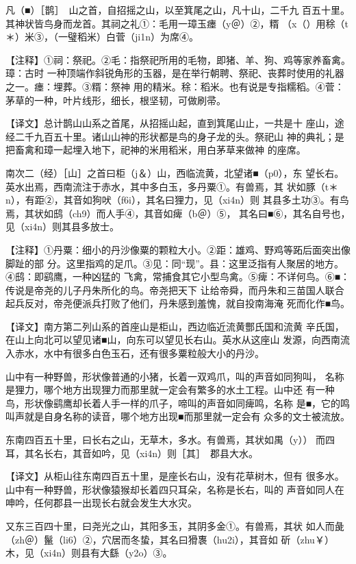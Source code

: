 \documentclass[a4paper,12pt,UTF8,twoside]{ctexbook}
\begin{document}
凡（■）［鹊］　山之首，自招摇之山，以至箕尾之山，凡十山，二千九 百五十里。其神状皆鸟身而龙首。其祠之礼①：毛用一璋玉瘗（y＠）②，糈 （x（）用稌（t＊）米③，（一璧稻米）白菅（ji1n）为席④。

【注释】①祠：祭祀。②毛：指祭祀所用的毛物，即猪、羊、狗、鸡等家养畜禽。璋：古时 一种顶端作斜锐角形的玉器，是在举行朝聘、祭祀、丧葬时使用的礼器之一。瘗：埋葬。③糈：祭神 用的精米。稌：稻米。也有说是专指糯稻。④菅：茅草的一种，叶片线形，细长，根坚韧，可做刷帚。

【译文】总计鹊山山系之首尾，从招摇山起，直到箕尾山止，一共是十 座山，途经二千九百五十里。诸山山神的形状都是鸟的身子龙的头。祭祀山 神的典礼；是把畜禽和璋一起埋入地下，祀神的米用稻米，用白茅草来做神 的座席。

南次二（经）［山］之首曰柜（j＆）山，西临流黄，北望诸■（p0），东 望长右。英水出焉，西南流注于赤水，其中多白玉，多丹粟①。有兽焉，其 状如豚（t＊n），有距②，其音如狗吠（f6i），其名曰狸力，见（xi4n）则 其县多土功③。有鸟焉，其状如鸱（ch9）而人手④，其音如痺（b＠）⑤， 其名曰■⑥，其名自号也，见（xi4n）则其县多放士。

【注释】①丹粟：细小的丹沙像粟的颗粒大小。②距：雄鸡、野鸡等跖后面突出像脚趾的部 分。这里指鸡的足爪。③见：同“现”。县：这里泛指有人聚居的地方。④鸱：即鹞鹰，一种凶猛的 飞禽，常捕食其它小型鸟禽。⑤痺：不详何鸟。⑥■：传说是帝尧的儿子丹朱所化的鸟。帝尧把天下 让给帝舜，而丹朱和三苗国人联合起兵反对，帝尧便派兵打败了他们，丹朱感到羞愧，就自投南海淹 死而化作■鸟。

【译文】南方第二列山系的首座山是柜山，西边临近流黄酆氏国和流黄 辛氏国，在山上向北可以望见诸■山，向东可以望见长右山。英水从这座山 发源，向西南流入赤水，水中有很多白色玉石，还有很多粟粒般大小的丹沙。

山中有一种野兽，形状像普通的小猪，长着一双鸡爪，叫的声音如同狗叫， 名称是狸力，哪个地方出现狸力而那里就一定会有繁多的水土工程。山中还 有一种鸟，形状像鹞鹰却长着人手一样的爪子，啼叫的声音如同痺鸣，名称 是■，它的鸣叫声就是自身名称的读音，哪个地方出现■而那里就一定会有 众多的文士被流放。

东南四百五十里，曰长右之山，无草木，多水。有兽焉，其状如禺（y）） 而四耳，其名长右，其音如吟，见（xi4n）则［其］　郡县大水。

【译文】从柜山往东南四百五十里，是座长右山，没有花草树木，但有 很多水。山中有一种野兽，形状像猿猴却长着四只耳朵，名称是长右，叫的 声音如同人在呻吟，任何郡县一出现长右就会发生大水灾。

又东三百四十里，曰尧光之山，其阳多玉，其阴多金①。有兽焉，其状 如人而彘（zh＠）鬣（li6）②，穴居而冬蛰，其名曰猾褢（hu2i），其音如 斫（zhu￥）木，见（xi4n）则县有大繇（y2o）③。
\end{document}
